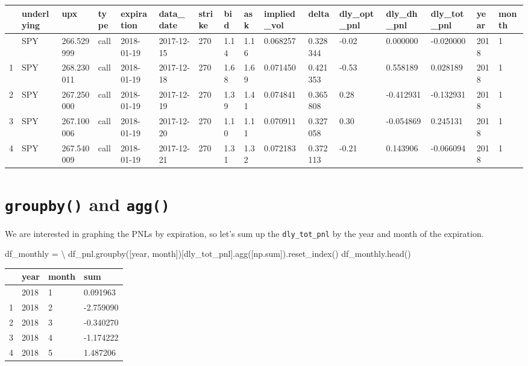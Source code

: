 \documentclass[
  letterpaper,
  DIV=11,
  numbers=noendperiod]{scrreprt}
\newenvironment{Shaded}{\begin{snugshade}}{\end{snugshade}}
\newcommand{\BuiltInTok}[1]{\textcolor[rgb]{0.00,0.23,0.31}{#1}}
\newcommand{\NormalTok}[1]{\textcolor[rgb]{0.00,0.23,0.31}{#1}}
\newcommand{\OperatorTok}[1]{\textcolor[rgb]{0.37,0.37,0.37}{#1}}
\newcommand{\StringTok}[1]{\textcolor[rgb]{0.13,0.47,0.30}{#1}}
\begin{document}
\begin{longtable}[]{@{}llllllllllllllll@{}}
\toprule\noalign{}
& underlying & upx & type & expiration & data\_date & strike & bid & ask
& implied\_vol & delta & dly\_opt\_pnl & dly\_dh\_pnl & dly\_tot\_pnl &
year & month \\
\midrule\noalign{}
\endhead
\bottomrule\noalign{}
\endlastfoot
0 & SPY & 266.529999 & call & 2018-01-19 & 2017-12-15 & 270 & 1.14 &
1.16 & 0.068257 & 0.328344 & -0.02 & 0.000000 & -0.020000 & 2018 & 1 \\
1 & SPY & 268.230011 & call & 2018-01-19 & 2017-12-18 & 270 & 1.68 &
1.69 & 0.071450 & 0.421353 & -0.53 & 0.558189 & 0.028189 & 2018 & 1 \\
2 & SPY & 267.250000 & call & 2018-01-19 & 2017-12-19 & 270 & 1.39 &
1.41 & 0.074841 & 0.365808 & 0.28 & -0.412931 & -0.132931 & 2018 & 1 \\
3 & SPY & 267.100006 & call & 2018-01-19 & 2017-12-20 & 270 & 1.10 &
1.11 & 0.070911 & 0.327058 & 0.30 & -0.054869 & 0.245131 & 2018 & 1 \\
4 & SPY & 267.540009 & call & 2018-01-19 & 2017-12-21 & 270 & 1.31 &
1.32 & 0.072183 & 0.372113 & -0.21 & 0.143906 & -0.066094 & 2018 & 1 \\
\end{longtable}

\hypertarget{groupby-and-agg}{%
\section{\texorpdfstring{\texttt{groupby()} and
\texttt{agg()}}{groupby() and agg()}}\label{groupby-and-agg}}

We are interested in graphing the PNLs by expiration, so let's sum up
the \texttt{dly\_tot\_pnl} by the year and month of the expiration.

\begin{Shaded}
\begin{Highlighting}[]
\NormalTok{df\_monthly }\OperatorTok{=} \OperatorTok{\textbackslash{}}
\NormalTok{    df\_pnl.groupby([}\StringTok{\textquotesingle{}year\textquotesingle{}}\NormalTok{, }\StringTok{\textquotesingle{}month\textquotesingle{}}\NormalTok{])[}\StringTok{\textquotesingle{}dly\_tot\_pnl\textquotesingle{}}\NormalTok{].agg([np.}\BuiltInTok{sum}\NormalTok{]).reset\_index()}
\NormalTok{df\_monthly.head()}
\end{Highlighting}
\end{Shaded}

\begin{longtable}[]{@{}llll@{}}
\toprule\noalign{}
& year & month & sum \\
\midrule\noalign{}
\endhead
\bottomrule\noalign{}
\endlastfoot
0 & 2018 & 1 & 0.091963 \\
1 & 2018 & 2 & -2.759090 \\
2 & 2018 & 3 & -0.340270 \\
3 & 2018 & 4 & -1.174222 \\
4 & 2018 & 5 & 1.487206 \\
\end{longtable}
\end{document}
